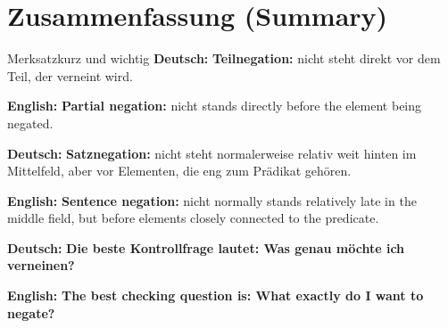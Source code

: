 \documentclass[a4paper,11pt]{article}
\newcommand{\GermanText}[1]{\textbf{Deutsch: }#1\par}
\newcommand{\EnglishText}[1]{{\small\color{SoftGray}\textbf{English: }#1\par}}
\begin{document}
\section{Zusammenfassung \textnormal{(Summary)}}

\begin{grammarentry}{Merksatz}{kurz und wichtig}
\GermanText{\textbf{Teilnegation:} nicht steht direkt vor dem Teil, der verneint wird.}
\EnglishText{\textbf{Partial negation:} nicht stands directly before the element being negated.}

\GermanText{\textbf{Satznegation:} nicht steht normalerweise relativ weit hinten im Mittelfeld, aber vor Elementen, die eng zum Prädikat gehören.}
\EnglishText{\textbf{Sentence negation:} nicht normally stands relatively late in the middle field, but before elements closely connected to the predicate.}

\GermanText{\textbf{Die beste Kontrollfrage lautet: Was genau möchte ich verneinen?}}
\EnglishText{\textbf{The best checking question is: What exactly do I want to negate?}}
\end{grammarentry}
\end{document}
